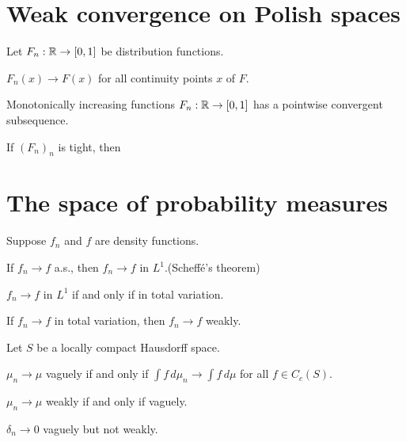 \documentclass{../note}
\begin{document}
\section{Weak convergence on Polish spaces}
\begin{prb}
Let $F_n:\mathbb{R}\to[0,1]$ be distribution functions.
\begin{parts}
\item $F_n(x)\to F(x)$ for all continuity points $x$ of $F$.
\end{parts}
\end{prb}
\begin{prb}
\end{prb}
\begin{prb}
\end{prb}
\begin{prb}
\end{prb}



\begin{prb}
\begin{parts}
\item Monotonically increasing functions $F_n:\mathbb{R}\to[0,1]$ has a pointwise convergent subsequence.
\item If $(F_n)_n$ is tight, then
\end{parts}
\end{prb}


\section{The space of probability measures}
\begin{prb}
Suppose $f_n$ and $f$ are density functions.
\begin{parts}
\item If $f_n\to f$ a.s., then $f_n\to f$ in $L^1$.\hfill(Scheff\'e's theorem)
\item $f_n\to f$ in $L^1$ if and only if in total variation.
\item If $f_n\to f$ in total variation, then $f_n\to f$ weakly.
\end{parts}
\end{prb}

\begin{prb}
Let $S$ be a locally compact Hausdorff space.
\begin{parts}
\item $\mu_n\to\mu$ vaguely if and only if $\int f\,d\mu_n\to\int f\,d\mu$ for all $f\in C_c(S)$.
\item $\mu_n\to\mu$ weakly if and only if vaguely.
\item $\delta_n\to0$ vaguely but not weakly.
\end{parts}
\end{prb}
\begin{pf}
\end{pf}
\end{document}
